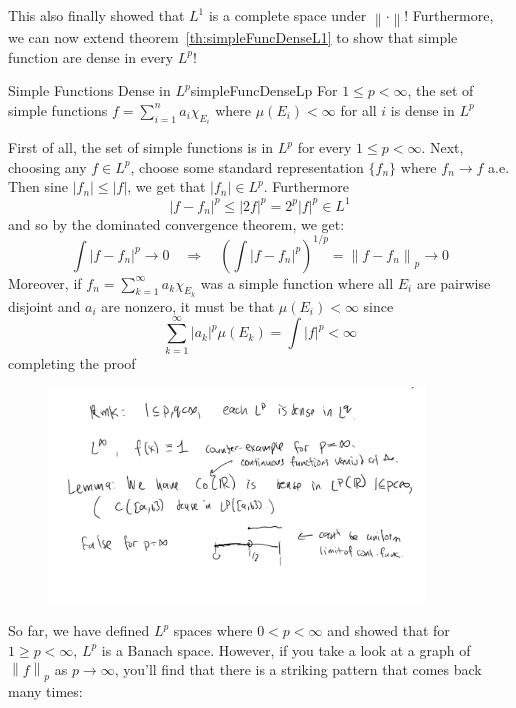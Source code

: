 \documentclass[oneside]{book}
\newcommand{\rw}{\rightarrow}
\newcommand{\Rw}{\Rightarrow}
\begin{document}
This also finally showed that $L^1$ is a complete space under $\left\| \cdot \right\|$! Furthermore, we can now extend
theorem~\ref{th:simpleFuncDenseL1} to show that simple function are dense in every $L^p$!

\begin{thm}{Simple Functions Dense in $L^p$}{simpleFuncDenseLp}
	For $1 \le p < \infty$, the set of simple functions $f = \sum_{i=1}^n a_i \chi_{E_i}$ where $\mu(E_i) < \infty$ for
	all $i$ is dense in $L^p$
\end{thm}

\begin{Proof}
	First of all, the set of simple functions is in $L^p$ for every $1 \le p < \infty$. Next, choosing any $f \in L^p$,
	choose some standard representation $\{f_n\}$ where $f_n \rw f$ a.e. Then sine $|f_n| \le |f|$, we get that $|f_n|
	\in L^p$. Furthermore
	\[
		|f-f_n|^p \le |2f|^p = 2^p|f|^p \in L^1
	\]
	and so by the dominated convergence theorem, we get:
	\[
		\int |f - f_n|^p \rw 0 \quad \Rw\quad \left(\int |f - f_n|^p\right)^{1/p} = \left\| f - f_n\right\|_p \rw 0
	\]
	Moreover, if $f_n = \sum_{k=1}^\infty a_k\chi_{E_k}$ was a simple function where all $E_i$ are pairwise disjoint and
	$a_i$ are nonzero, it must be that $\mu(E_i) < \infty$ since
	\[
		\sum_{k=1}^\infty |a_k|^p\mu(E_k) = \int |f|^p < \infty
	\]
	completing the proof
\end{Proof}

\begin{figure}[H]
	\centering
	\includegraphics[width=10cm]{toInclude}
\end{figure}

So far, we have defined $L^p$ spaces where $0 < p < \infty$ and showed that for $1 \ge p < \infty$, $L^p$ is a Banach
space. However, if you take a look at a graph of $\left\| f\right\|_p$ as $p \rw \infty$, you'll find that there is
a striking pattern that comes back many times:
\end{document}
